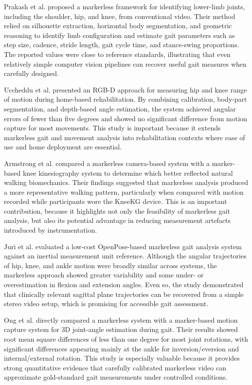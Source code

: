 \documentclass[12pt]{elsarticle}
\begin{document}
Prakash et al. \cite{prakash2018vision} proposed a markerless framework for identifying lower-limb joints, including the shoulder, hip, and knee, from conventional video. Their method relied on silhouette extraction, horizontal body segmentation, and geometric reasoning to identify limb configuration and estimate gait parameters such as step size, cadence, stride length, gait cycle time, and stance-swing proportions. The reported values were close to reference standards, illustrating that even relatively simple computer vision pipelines can recover useful gait measures when carefully designed.

Uccheddu et al. \cite{uccheddu2022rgb} presented an RGB-D approach for measuring hip and knee range of motion during home-based rehabilitation. By combining calibration, body-part segmentation, and depth-based angle estimation, the system achieved angular errors of fewer than five degrees and showed no significant difference from motion capture for most movements. This study is important because it extends markerless gait and movement analysis into rehabilitation contexts where ease of use and home deployment are essential.

Armstrong et al. \cite{armstrong2022novel} compared a markerless camera-based system with a marker-based knee kinesiography system to determine which better reflected natural walking biomechanics. Their findings suggested that markerless analysis produced a more representative walking pattern, particularly when compared with motion recorded while participants wore the KneeKG device. This is an important contribution, because it highlights not only the feasibility of markerless gait analysis, but also its potential advantage in reducing measurement artefacts introduced by instrumentation.

Juri et al. \cite{juri2020characterization} evaluated a low-cost OpenPose-based markerless gait analysis system against an inertial measurement unit reference. Although the angular trajectories of hip, knee, and ankle motion were broadly similar across systems, the markerless approach showed greater variability and some under- or overestimation in flexion and extension angles. Even so, the study demonstrated that clinically relevant sagittal plane trajectories can be recovered from a simple stereo video setup, which is promising for accessible gait assessment.

Ong et al. \cite{ong2017efficacy} directly compared a markerless system with a marker-based motion capture system for 3D joint-angle estimation during gait. Their results showed root mean square differences of less than one degree for most joint rotations, with significant differences appearing mainly at the ankle for inversion/eversion and internal/external rotation. This study is especially valuable because it provides strong quantitative evidence that carefully calibrated markerless video can approximate gold-standard gait measurements under controlled conditions.
\end{document}

